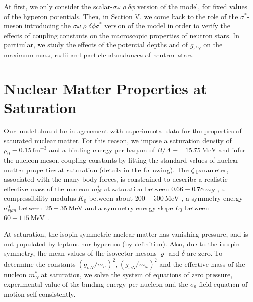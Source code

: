 \documentclass[twocolumn,showpacs,aps]{revtex4}
\begin{document}
At first, we only consider the scalar-$\sigma\omega\varrho\delta\phi$ version of the model, for fixed values of 
the hyperon potentials. Then, in Section V, we come back to the role of the $\sigma^*$-meson 
introducing the $\sigma\omega\varrho\delta\phi\sigma^*$ version of the model in order to verify the effects
of coupling constants on the macroscopic properties of neutron stars.
In particular, we study the effects of the potential depths and of $g_{\sigma^* Y}$ on the maximum mass, radii and 
particle abundances of neutron stars. %



\section{Nuclear Matter Properties at Saturation} \label{saturation_section}

Our model should be in agreement with experimental data for the properties of saturated nuclear matter.
For this reason, we impose a saturation density of $\rho_0= 0.15 \,\mathrm{fm}^{-3}$
  and a binding energy per baryon of $B/A = -15.75\,\mathrm{MeV}$ \cite{Walecka1986} and
infer the nucleon-meson coupling constants by fitting the standard values of nuclear matter properties at saturation (details in the following).
The $\zeta$ parameter, associated with the many-body forces, is constrained to describe a realistic effective mass of the nucleon $m_N^*$ 
at saturation between $0.66-0.78 \,m_N$ \cite{Johnson:1987zza,Jaminon:1989wj}, a compressibility modulus $K_0$ between about $200-300 \,\mathrm{MeV}$ \cite{Blaizot:1980tw,Glendenning:1987gd,Sharma:1988zza}, 
a symmetry energy $a^0_{sym}$ between $25 - 35\,\mathrm{MeV}$ \cite{Tsang:2012se,Lattimer:2012xj} and a symmetry energy slope $L_0$ between $60-115 \,\mathrm{MeV}$ \cite{Chen:2005ti,Lattimer:2012xj,Lopes:2014wda}. 

At saturation, the isopin-symmetric nuclear matter has vanishing pressure, and is not populated by leptons nor hyperons (by definition). 
Also, due to the isospin symmetry, the mean values of the isovector mesons $\varrho$ and $\delta$ are zero.
To determine the constants $(g_{\sigma N}/m_{\sigma})^2$, $(g_{\omega N}/m_{\omega})^2$ and the effective mass of the nucleon $m^*_N$ at 
saturation, we solve the system of equations of zero pressure, experimental value of the
binding energy per nucleon and the $\sigma_0$ field equation of motion self-consistently. 
\end{document}
